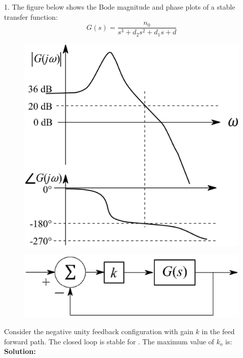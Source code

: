\begin{enumerate}[label=\thesection.\arabic*.,ref=\thesection.\theenumi]
1. The figure below shows the Bode magnitude and phase plots of a stable transfer function:
\begin{equation}  
            G(s) = \frac{n_0}{s^3 + d_2 s^2 + d_1 s + d}
\end{equation}
\begin{figure}[h]
            \includegraphics[scale = 0.25]{./figs/q42 (1).eps}
\end{figure}

\begin{figure}[h]
            \includegraphics[scale = 0.4]{./figs/q42.eps}
\end{figure}
 Consider the negative unity feedback configuration with gain $k$ in the feed forward path. The closed loop is stable for  . 
    The maximum value of $k_o$  is: \\


\textbf{ Solution:}


\end{enumerate}
